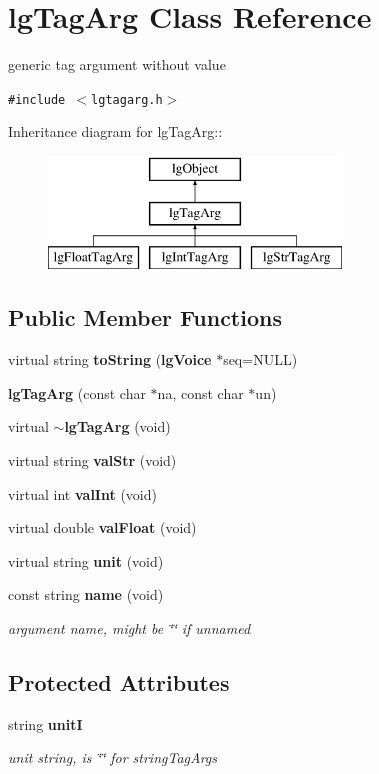\section{lg\-Tag\-Arg Class Reference}
\label{classlgTagArg}
generic tag argument without value  


{\tt \#include $<$lgtagarg.h$>$}

Inheritance diagram for lg\-Tag\-Arg::\begin{figure}[H]
\begin{center}
\leavevmode
\includegraphics[height=3cm]{classlgTagArg}
\end{center}
\end{figure}
\subsection*{Public Member Functions}
\begin{CompactItemize}
\item 
virtual string {\bf to\-String} ({\bf lg\-Voice} $\ast$seq=NULL)
\item 
{\bf lg\-Tag\-Arg} (const char $\ast$na, const char $\ast$un)
\item 
virtual {\bf $\sim$lg\-Tag\-Arg} (void)
\item 
virtual string {\bf val\-Str} (void)
\item 
virtual int {\bf val\-Int} (void)
\item 
virtual double {\bf val\-Float} (void)
\item 
virtual string {\bf unit} (void)
\item 
const string {\bf name} (void)
\begin{CompactList}\small\item\em argument name, might be \char`\"{}\char`\"{} if unnamed \item\end{CompactList}\end{CompactItemize}
\subsection*{Protected Attributes}
\begin{CompactItemize}
\item 
string {\bf unit\-I}
\begin{CompactList}\small\item\em unit string, is \char`\"{}\char`\"{} for string\-Tag\-Args \item\end{CompactList}\end{CompactItemize}
